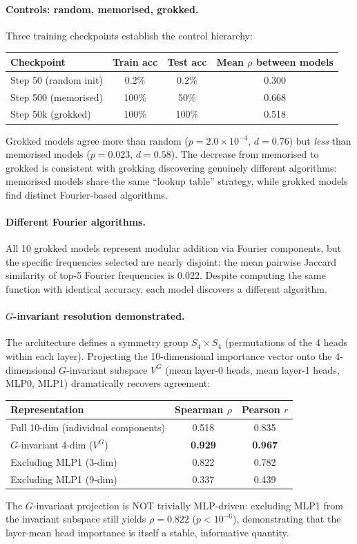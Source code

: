 \documentclass[11pt,a4paper]{article}
\begin{document}
\paragraph{Controls: random, memorised, grokked.}
Three training checkpoints establish the control hierarchy:
\begin{center}
\small
\begin{tabular}{lccc}
\toprule
Checkpoint & Train acc & Test acc & Mean $\rho$ between models \\
\midrule
Step 50 (random init) & 0.2\% & 0.2\% & 0.300 \\
Step 500 (memorised) & 100\% & 50\% & 0.668 \\
Step 50k (grokked) & 100\% & 100\% & 0.518 \\
\bottomrule
\end{tabular}
\end{center}
Grokked models agree more than random ($p = 2.0 \times 10^{-4}$, $d = 0.76$) but \emph{less} than memorised models ($p = 0.023$, $d = 0.58$).  The decrease from memorised to grokked is consistent with grokking discovering genuinely different algorithms: memorised models share the same ``lookup table'' strategy, while grokked models find distinct Fourier-based algorithms.

\paragraph{Different Fourier algorithms.}
All 10 grokked models represent modular addition via Fourier components, but the specific frequencies selected are nearly disjoint: the mean pairwise Jaccard similarity of top-5 Fourier frequencies is 0.022.  Despite computing the same function with identical accuracy, each model discovers a different algorithm.

\paragraph{$G$-invariant resolution demonstrated.}
The architecture defines a symmetry group $S_4 \times S_4$ (permutations of the 4 heads within each layer).  Projecting the 10-dimensional importance vector onto the 4-dimensional $G$-invariant subspace $V^G$ (mean layer-0 heads, mean layer-1 heads, MLP0, MLP1) dramatically recovers agreement:
\begin{center}
\small
\begin{tabular}{lcc}
\toprule
Representation & Spearman $\rho$ & Pearson $r$ \\
\midrule
Full 10-dim (individual components) & 0.518 & 0.835 \\
$G$-invariant 4-dim ($V^G$) & \textbf{0.929} & \textbf{0.967} \\
Excluding MLP1 (3-dim) & 0.822 & 0.782 \\
Excluding MLP1 (9-dim) & 0.337 & 0.439 \\
\bottomrule
\end{tabular}
\end{center}
The $G$-invariant projection is NOT trivially MLP-driven: excluding MLP1 from the invariant subspace still yields $\rho = 0.822$ ($p < 10^{-6}$), demonstrating that the layer-mean head importance is itself a stable, informative quantity.
\end{document}
